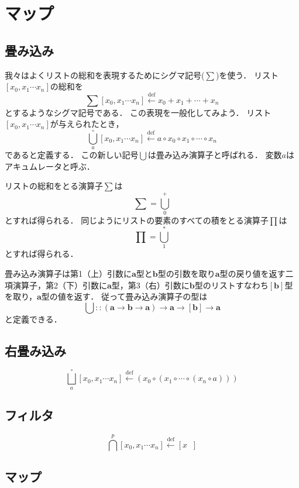 \documentclass[twocolumn]{jsbook}
\newcommand{\defeq}{\xleftarrow{\text{def}}}
\newcommand{\filterfunc}{\bigcap} %
\newcommand{\foldfunc}{\bigcup} %
\newcommand{\foldrightfunc}{\bigsqcup} %
\newcommand{\guard}[1]{\mathop{\mid_{{#1}}}}
\newcommand{\truevalue}{\text{T}}
\newcommand{\typename}[1]{\bm{#1}}
\newcommand{\listtype}[1]{\left[#1\right]}
\begin{document}
\chapter{マップ}

\section{畳み込み}

我々はよくリストの総和を表現するためにシグマ記号($\sum$)を使う．
リスト$\listtype{x_0,x_1\dotsb x_n}$の総和を$$\sum\listtype{x_0,x_1\dotsb x_n}\defeq x_0+x_1+\dotsb+x_n$$とするようなシグマ記号である．
この表現を一般化してみよう．
リスト$\listtype{x_0,x_1\dotsb x_n}$が与えられたとき，$$\foldfunc^\circ_a\listtype{x_0,x_1\dotsb x_n}\defeq a\circ x_0\circ x_1\circ\dotsb\circ x_n$$であると定義する．
この新しい記号$\foldfunc$は畳み込み演算子と呼ばれる．
変数$a$はアキュムレータと呼ぶ．

リストの総和をとる演算子$\sum$は$$\sum=\foldfunc^+_0$$とすれば得られる．
同じようにリストの要素のすべての積をとる演算子$\prod$は$$\prod=\foldfunc^\ast_1$$とすれば得られる．

畳み込み演算子は第1（上）引数に$\typename{a}$型と$\typename{b}$型の引数を取り$\typename{a}$型の戻り値を返す二項演算子，第2（下）引数に$\typename{a}$型，第3（右）引数に$\typename{b}$型のリストすなわち$\listtype{\typename{b}}$型を取り，$\typename{a}$型の値を返す．
従って畳み込み演算子の型は$$\foldfunc::(\typename{a}\rightarrow\typename{b}\rightarrow\typename{a})\rightarrow\typename{a}\rightarrow\listtype{\typename{b}}\rightarrow\typename{a}$$と定義できる．

\section{右畳み込み}

$$\foldrightfunc_a^\circ\listtype{x_0,x_1\dotsb x_n}\defeq\left(x_0\circ\left(x_1\circ\dotsb\circ\left(x_n\circ a\right)\right)\right)$$

\section{フィルタ}

$$\filterfunc^p\listtype{x_0,x_1\dotsb x_n}\defeq\listtype{x\guard{x\in\listtype{x_0,x_1\dotsb x_n}\wedge px\equiv\truevalue}}$$

\section{マップ}
\end{document}
